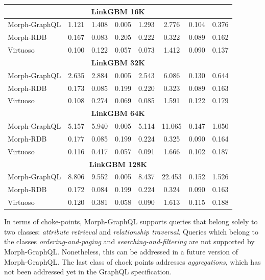 \begin{table}[]
{\begin{tabular}{l|c|c|c|c|c|c|c}
\multicolumn{8}{c}{\textbf{LinkGBM 16K}}                             \\ \hline
Morph-GraphQL & 1.121 & 1.408 & 0.005 & 1.293 & 2.776  & 0.104 & 0.376 \\ \hline
Morph-RDB     & 0.167 & 0.083 & 0.205 & 0.222 & 0.322  & 0.089 & 0.162 \\ \hline
Virtuoso      & 0.100 & 0.122 & 0.057 & 0.073 & 1.412  & 0.090 & 0.137 \\ \hline
\multicolumn{8}{c}{\textbf{LinkGBM 32K}}                             \\ \hline
Morph-GraphQL & 2.635 & 2.884 & 0.005 & 2.543 & 6.086  & 0.130 & 0.644 \\ \hline
Morph-RDB     & 0.173 & 0.085 & 0.199 & 0.220 & 0.323  & 0.089 & 0.163 \\ \hline
Virtuoso      & 0.108 & 0.274 & 0.069 & 0.085 & 1.591  & 0.122 & 0.179 \\ \hline
\multicolumn{8}{c}{\textbf{LinkGBM 64K}}                             \\ \hline
Morph-GraphQL & 5.157 & 5.940 & 0.005 & 5.114 & 11.065 & 0.147 & 1.050 \\ \hline
Morph-RDB     & 0.177 & 0.085 & 0.199 & 0.224 & 0.325  & 0.090 & 0.164 \\ \hline
Virtuoso      & 0.116 & 0.417 & 0.057 & 0.091 & 1.666  & 0.102 & 0.187 \\ \hline
\multicolumn{8}{c}{\textbf{LinkGBM 128K}}                            \\ \hline
Morph-GraphQL & 8.806 & 9.552 & 0.005 & 8.437 & 22.453 & 0.152 & 1.526 \\ \hline
Morph-RDB     & 0.172 & 0.084 & 0.199 & 0.224 & 0.324  & 0.090 & 0.163 \\ \hline
Virtuoso      & 0.120 & 0.381 & 0.058 & 0.090 & 1.613  & 0.115 & 0.188 \\ \hline
\end{tabular}%
}
\end{table}

In terms of choke-points, Morph-GraphQL supports queries that belong solely to two classes: \textit{attribute retrieval} and \textit{relationship traversal}. Queries which belong to the classes \textit{ordering-and-paging} and \textit{searching-and-filtering} are not supported by Morph-GraphQL. Nonetheless, this can be addressed in a future version of Morph-GraphQL. The last class of chock points addresses \textit{aggregations}, which has not been addressed yet in the GraphQL specification.


